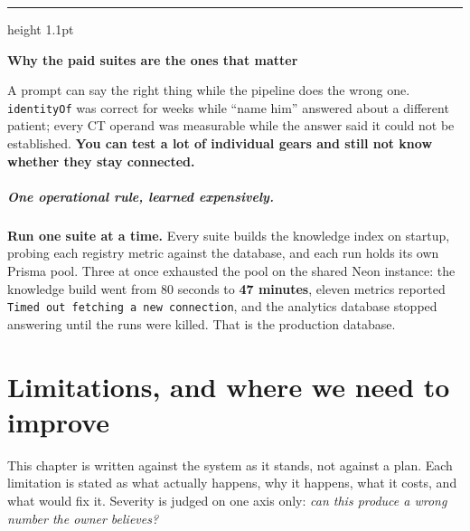 \documentclass[11pt,a4paper]{report}
\newcommand{\code}[1]{\texttt{\small #1}}
\newenvironment{keybox}[1]
 {\par\medskip\begin{center}\begin{minipage}{0.94\textwidth}%
  {\color{navy}\hrule height 1.1pt}\vspace{5pt}\par
  \textbf{\color{navy}#1}\par\vspace{3pt}\small}
 {\par\vspace{5pt}{\color{mist}\hrule height 0.8pt}\end{minipage}\end{center}\medskip}
\begin{document}
\begin{keybox}{Why the paid suites are the ones that matter}
A prompt can say the right thing while the pipeline does the wrong one. \code{identityOf} was
correct for weeks while ``name him'' answered about a different patient; every CT operand was
measurable while the answer said it could not be established. \textbf{You can test a lot of
individual gears and still not know whether they stay connected.}
\end{keybox}

\paragraph{One operational rule, learned expensively.} \textbf{Run one suite at a time.} Every suite
builds the knowledge index on startup, probing each registry metric against the database, and each
run holds its own Prisma pool. Three at once exhausted the pool on the shared Neon instance: the
knowledge build went from 80 seconds to \textbf{47 minutes}, eleven metrics reported
\code{Timed out fetching a new connection}, and the analytics database stopped answering until the
runs were killed. That is the production database.

\chapter{Limitations, and where we need to improve}

This chapter is written against the system as it stands, not against a plan. Each limitation is
stated as what actually happens, why it happens, what it costs, and what would fix it. Severity is
judged on one axis only: \emph{can this produce a wrong number the owner believes?}
\end{document}
